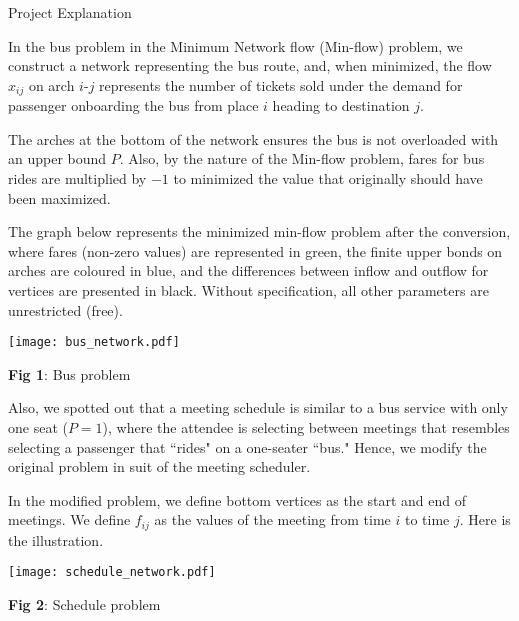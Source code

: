 \documentclass{article}
\begin{document}
\begin{center}
{\huge Project Explanation
}
\end{center}
In the bus problem in the Minimum Network flow (Min-flow) problem, we construct a network representing the bus route, and, when minimized, the flow $x_{ij}$ on arch $i$-$j$ represents the number of tickets sold under the demand for passenger onboarding the bus from place $i$ heading to destination $j$.

The arches at the bottom of the network ensures the bus is not overloaded with an upper bound $P$. Also, by the nature of the Min-flow problem, fares for bus rides are multiplied by $-1$ to minimized the value that originally should have been maximized.

The graph below represents the minimized min-flow problem after the conversion, where fares (non-zero values) are represented in {\color{ForestGreen} green}, the finite upper bonds on arches are coloured in {\color{blue} blue}, and the differences between inflow and outflow for vertices are presented in black. Without specification, all other parameters are unrestricted (free).

\begin{center}
\texttt{[image: bus\_network.pdf]}

{\small \textbf{Fig 1}: Bus problem}
\end{center}

Also, we spotted out that a meeting schedule is similar to a bus service with only one seat ($P=1$), where the attendee is selecting between meetings that resembles selecting a passenger that ``rides" on a one-seater ``bus." Hence, we modify the original problem in suit of the meeting scheduler.

In the modified problem, we define bottom vertices as the start and end of meetings. We define $f_{ij}$ as the values of the meeting from time $i$ to time $j$. Here is the illustration.

\begin{center}
\texttt{[image: schedule\_network.pdf]}

{\small \textbf{Fig 2}: Schedule problem}
\end{center}
\end{document}
